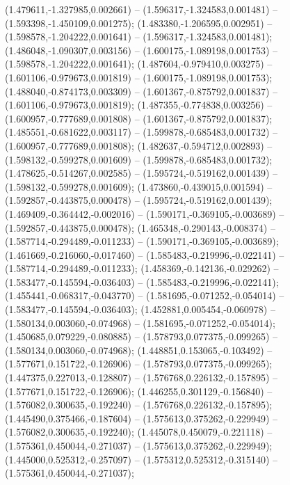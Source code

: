  (1.479611,-1.327985,0.002661) -- (1.596317,-1.324583,0.001481) -- (1.593398,-1.450109,0.001275);
 (1.483380,-1.206595,0.002951) -- (1.598578,-1.204222,0.001641) -- (1.596317,-1.324583,0.001481);
 (1.486048,-1.090307,0.003156) -- (1.600175,-1.089198,0.001753) -- (1.598578,-1.204222,0.001641);
 (1.487604,-0.979410,0.003275) -- (1.601106,-0.979673,0.001819) -- (1.600175,-1.089198,0.001753);
 (1.488040,-0.874173,0.003309) -- (1.601367,-0.875792,0.001837) -- (1.601106,-0.979673,0.001819);
 (1.487355,-0.774838,0.003256) -- (1.600957,-0.777689,0.001808) -- (1.601367,-0.875792,0.001837);
 (1.485551,-0.681622,0.003117) -- (1.599878,-0.685483,0.001732) -- (1.600957,-0.777689,0.001808);
 (1.482637,-0.594712,0.002893) -- (1.598132,-0.599278,0.001609) -- (1.599878,-0.685483,0.001732);
 (1.478625,-0.514267,0.002585) -- (1.595724,-0.519162,0.001439) -- (1.598132,-0.599278,0.001609);
 (1.473860,-0.439015,0.001594) -- (1.592857,-0.443875,0.000478) -- (1.595724,-0.519162,0.001439);
 (1.469409,-0.364442,-0.002016) -- (1.590171,-0.369105,-0.003689) -- (1.592857,-0.443875,0.000478);
 (1.465348,-0.290143,-0.008374) -- (1.587714,-0.294489,-0.011233) -- (1.590171,-0.369105,-0.003689);
 (1.461669,-0.216060,-0.017460) -- (1.585483,-0.219996,-0.022141) -- (1.587714,-0.294489,-0.011233);
 (1.458369,-0.142136,-0.029262) -- (1.583477,-0.145594,-0.036403) -- (1.585483,-0.219996,-0.022141);
 (1.455441,-0.068317,-0.043770) -- (1.581695,-0.071252,-0.054014) -- (1.583477,-0.145594,-0.036403);
 (1.452881,0.005454,-0.060978) -- (1.580134,0.003060,-0.074968) -- (1.581695,-0.071252,-0.054014);
 (1.450685,0.079229,-0.080885) -- (1.578793,0.077375,-0.099265) -- (1.580134,0.003060,-0.074968);
 (1.448851,0.153065,-0.103492) -- (1.577671,0.151722,-0.126906) -- (1.578793,0.077375,-0.099265);
 (1.447375,0.227013,-0.128807) -- (1.576768,0.226132,-0.157895) -- (1.577671,0.151722,-0.126906);
 (1.446255,0.301129,-0.156840) -- (1.576082,0.300635,-0.192240) -- (1.576768,0.226132,-0.157895);
 (1.445490,0.375466,-0.187604) -- (1.575613,0.375262,-0.229949) -- (1.576082,0.300635,-0.192240);
 (1.445078,0.450079,-0.221118) -- (1.575361,0.450044,-0.271037) -- (1.575613,0.375262,-0.229949);
 (1.445000,0.525312,-0.257097) -- (1.575312,0.525312,-0.315140) -- (1.575361,0.450044,-0.271037);
